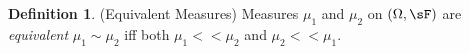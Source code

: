\documentclass[12pt]{article}
\theoremstyle{plain}
\newtheorem{lem}[thm]{Lemma}
\theoremstyle{definition}
\newtheorem{defn}[thm]{Definition}
\theoremstyle{remark}
\newcommand{\one}[1]{\mathbf{1}_{#1}}
\newcommand{\sumninf}{\sum^\infty_{n=1}}
\begin{document}
\begin{defn}(Equivalent Measures)
Measures $\mu_1$ and $\mu_2$ on $(\Omega,\sF)$
are \emph{equivalent} $\mu_1\sim\mu_2$
iff both $\mu_1<<\mu_2$ and $\mu_2<<\mu_1$.
\end{defn}


\end{document}
